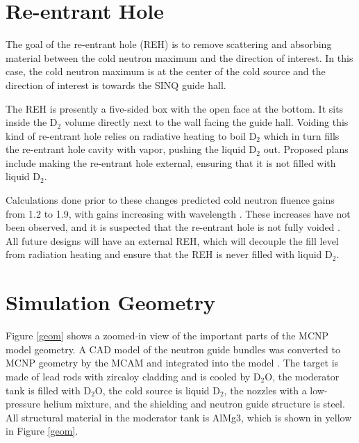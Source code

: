 \documentclass[a4paper]{jpconf}
\begin{document}
\section{Re-entrant Hole}

The goal of the re-entrant hole (REH) is to remove scattering and absorbing material between the cold neutron maximum and the direction of interest.  In this case, the cold neutron maximum is at the center of the cold source and the direction of interest is towards the SINQ guide hall.  

The REH is presently a five-sided box with the open face at the bottom.  It sits inside the D$_2$ volume directly next to the wall facing the guide hall.  Voiding this kind of re-entrant hole relies on radiative heating to boil D$_2$ which in turn fills the re-entrant hole cavity with vapor, pushing the liquid D$_2$ out.  Proposed plans include making the re-entrant hole external, ensuring that it is not filled with liquid D$_2$.

Calculations done prior to these changes predicted cold neutron fluence gains from 1.2 to 1.9, with gains increasing with wavelength \cite{atch_icans}. These increases have not been observed, and it is suspected that the re-entrant hole is not fully voided \cite{voided}.  All future designs will have an external REH, which will decouple the fill level from radiation heating and ensure that the REH is never filled with liquid D$_2$.

\section{Simulation Geometry}

Figure \ref{geom} shows a zoomed-in view of the important parts of the MCNP model geometry.  A CAD model of the neutron guide bundles was converted to MCNP geometry by the MCAM and integrated into the model \cite{mcam}.  The target is made of lead rods with zircaloy cladding and is cooled by D$_2$O, the moderator tank is filled with D$_2$O, the cold source is liquid D$_2$, the nozzles with a low-pressure helium mixture, and the shielding and neutron guide structure is steel.  All structural material in the moderator tank is AlMg3, which is shown in yellow in Figure \ref{geom}.
\end{document}
